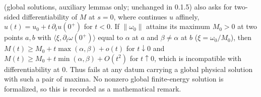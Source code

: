 \begin{remark}
 (global solutions, auxiliary lemmas only; unchanged in 0.1.5) also asks for two-sided
differentiability of $M$ at $s=0$, where  continues $u$ affinely,
$u(t)=u_0+t\,\partial_tu(0^+)$ for $t<0$. If $\|\omega_0\|$ attains its maximum $M_0>0$ at two points $a,b$ with
$\langle\xi,\partial_t\omega(0^+)\rangle$ equal to $\alpha$ at $a$ and $\beta\neq\alpha$ at $b$ ($\xi=\omega_0/M_0$),
then $M(t)\ge M_0+t\max(\alpha,\beta)+o(t)$ for $t\downarrow0$ and $M(t)\ge M_0+t\min(\alpha,\beta)+O(t^2)$ for
$t\uparrow0$, which is incompatible with differentiability at $0$. Thus  fails at any datum
carrying a global physical solution with such a pair of maxima. No nonzero global finite-energy solution is
formalized, so this is recorded as a mathematical remark.
\end{remark}


